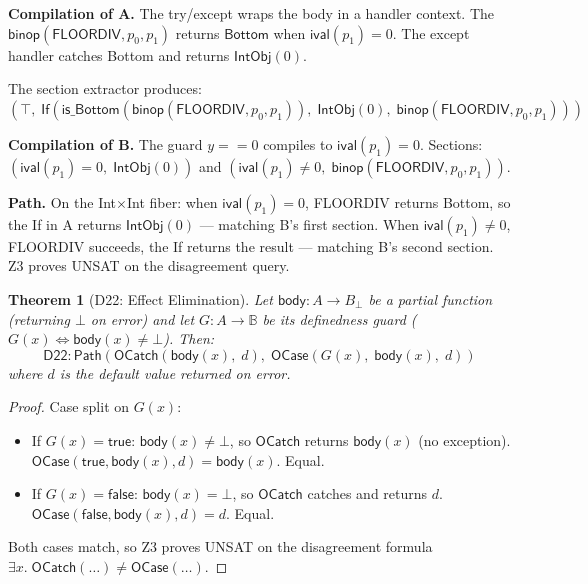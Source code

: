 \documentclass[11pt,a4paper]{report}
\theoremstyle{definition}
\theoremstyle{plain}
\newtheorem{theorem}[definition]{Theorem}
\newcommand{\Path}{\mathsf{Path}}
\newcommand{\Bool}{\mathbb{B}}
\begin{document}
\textbf{Compilation of A.}
The try/except wraps the body in a handler context.  The
$\mathsf{binop}(\mathsf{FLOORDIV}, p_0, p_1)$ returns
$\mathsf{Bottom}$ when $\mathsf{ival}(p_1) = 0$.  The except
handler catches Bottom and returns $\mathsf{IntObj}(0)$.

The section extractor produces:
$(\top,\; \mathsf{If}(\mathsf{is\_Bottom}(\mathsf{binop}(\mathsf{FLOORDIV},
p_0, p_1)),\; \mathsf{IntObj}(0),\; \mathsf{binop}(\mathsf{FLOORDIV},
p_0, p_1)))$

\textbf{Compilation of B.}
The guard $y == 0$ compiles to $\mathsf{ival}(p_1) = 0$.  Sections:
$(\mathsf{ival}(p_1) = 0,\; \mathsf{IntObj}(0))$ and
$(\mathsf{ival}(p_1) \neq 0,\; \mathsf{binop}(\mathsf{FLOORDIV}, p_0, p_1))$.

\textbf{Path.}
On the Int$\times$Int fiber: when $\mathsf{ival}(p_1) = 0$,
FLOORDIV returns Bottom, so the If in A returns $\mathsf{IntObj}(0)$
--- matching B's first section.  When $\mathsf{ival}(p_1) \neq 0$,
FLOORDIV succeeds, the If returns the result --- matching B's second
section.  Z3 proves UNSAT on the disagreement query.

\begin{theorem}[D22: Effect Elimination]
\label{thm:d22-effect}
Let $\mathsf{body} : A \to B_\bot$ be a partial function (returning
$\bot$ on error) and let $G : A \to \Bool$ be its \emph{definedness
guard} ($G(x) \Leftrightarrow \mathsf{body}(x) \neq \bot$).  Then:
\[
  \mathsf{D22} : \Path\!\left(
    \mathsf{OCatch}(\mathsf{body}(x),\; d),\;
    \mathsf{OCase}(G(x),\; \mathsf{body}(x),\; d)
  \right)
\]
where $d$ is the default value returned on error.
\end{theorem}

\begin{proof}
Case split on $G(x)$:
\begin{itemize}
  \item If $G(x) = \mathsf{true}$: $\mathsf{body}(x) \neq \bot$,
    so $\mathsf{OCatch}$ returns $\mathsf{body}(x)$ (no exception).
    $\mathsf{OCase}(\mathsf{true}, \mathsf{body}(x), d) =
    \mathsf{body}(x)$.  Equal.
  \item If $G(x) = \mathsf{false}$: $\mathsf{body}(x) = \bot$, so
    $\mathsf{OCatch}$ catches and returns $d$.
    $\mathsf{OCase}(\mathsf{false}, \mathsf{body}(x), d) = d$.
    Equal.
\end{itemize}
Both cases match, so Z3 proves UNSAT on the disagreement formula
$\exists x.\; \mathsf{OCatch}(\ldots) \neq \mathsf{OCase}(\ldots)$.
\end{proof}
\end{document}
